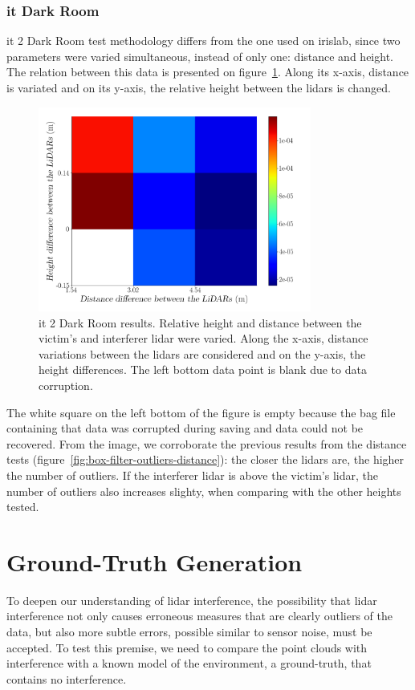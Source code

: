 \subsubsection{\ac{it} Dark Room}
\ac{it} 2 Dark Room test methodology differs from the one used on \ac{irislab}, since two parameters were varied simultaneous, instead of only one: distance and height. The relation between this data is presented on figure~\ref{fig:box-filter-outliers-it2}. Along its x-axis, distance is variated and on its y-axis, the relative height between the \acp{lidar} is changed.

\begin{figure}[!ht]
	\centering
	\includegraphics[width=0.8\textwidth]{img/lidar-interference/box-filtering/interference-box-filter-outliers-it2.png}
	\caption{\ac{it} 2 Dark Room results. Relative height and distance between the victim's and interferer \ac{lidar} were varied. Along the x-axis, distance variations between the \acp{lidar} are considered and on the y-axis, the height differences. The left bottom data point is blank due to data corruption.}
	\label{fig:box-filter-outliers-it2}
\end{figure}

The white square on the left bottom of the figure is empty because the bag file containing that data was corrupted during saving and data could not be recovered. From the image, we corroborate the previous results from the distance tests (figure~\ref{fig:box-filter-outliers-distance}): the closer the \acp{lidar} are, the higher the number of outliers. If the interferer \ac{lidar} is above the victim's \ac{lidar}, the number of outliers also increases slighty, when comparing with the other heights tested.

\section{Ground-Truth Generation}
\label{sec:lidar-interference:ground-truth-generation}
To deepen our understanding of \ac{lidar} interference, the possibility that \ac{lidar} interference not only causes erroneous measures that are clearly outliers of the data, but also more subtle errors, possible similar to sensor noise, must be accepted. To test this premise, we need to compare the point clouds with interference with a known model of the environment, a ground-truth, that contains no interference.  

